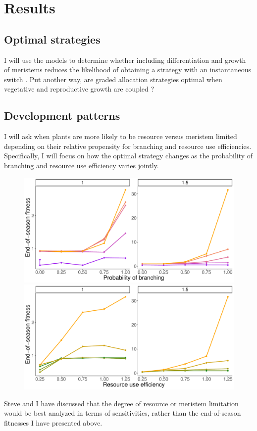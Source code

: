 \documentclass[12pt, oneside]{article}   	%
\begin{document}
\clearpage
\newpage

\section{Results}

\subsection{Optimal strategies}

I will use the models to determine whether including differentiation and growth of meristems reduces the likelihood of obtaining a strategy with an instantaneous switch \cite{Cohen1971}. Put another way, are graded allocation strategies optimal when vegetative and reproductive growth are coupled \cite{Fox1992}?

\subsection{Development patterns}

I will ask when plants are more likely to be resource versus meristem limited depending on their relative propensity for branching and resource use efficiencies. Specifically, I will focus on how the optimal strategy changes as the probability of branching and resource use efficiency varies jointly.

 \begin{figure}[!h]
       \includegraphics[page=1,width=.5\textwidth]{../figures/resources2.pdf}  
       \includegraphics[page=1,width=.5\textwidth]{../figures/resources3.pdf}  
\end{figure}

Steve and I have discussed that the degree of resource or meristem limitation would be best analyzed in terms of sensitivities, rather than the end-of-season fitnesses I have presented above. 
\end{document}
